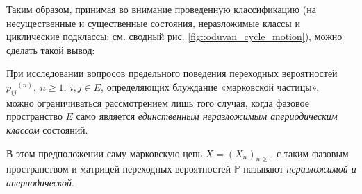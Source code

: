 Таким образом, принимая во внимание проведенную классификацию
(на несущественные и существенные состояния, неразложимые классы и
циклические подклассы; см. сводный рис. \ref{fig::oduvan_cycle_motion}), можно сделать такой вывод:

\begin{center}
  При исследовании вопросов предельного поведения переходных вероятностей\\
  ${p_{ij}}^{(n)},~ n \geq 1,~ i,j \in E$, определяющих блуждание «марковской частицы»,\\ можно ограничиваться рассмотрением лишь того случая, когда фазовое\\ пространство $E$ само является \emph{единственным неразложимым апериодическим\\ классом} состояний.
\end{center}

В этом предположении саму марковскую цепь $X = (X_n)_{n \geq 0}$ с таким
фазовым пространством и матрицей переходных вероятностей $\mathbb{P}$ называют
\emph{неразложимой и апериодической}.

